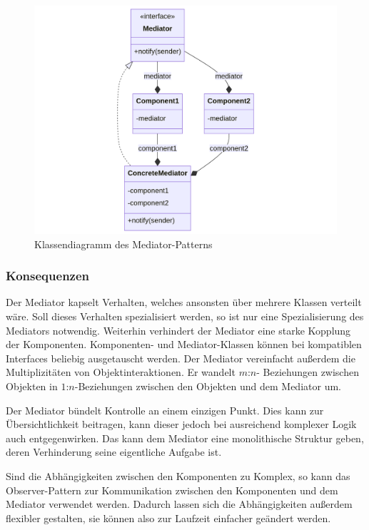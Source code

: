 \begin{figure}[H]
	\centering
	\includegraphics[width=0.75\linewidth]{images/patterns/mediator-class.png}
	\caption{Klassendiagramm des Mediator-Patterns \cite{skobeleva_mediator_2023}}
	\label{fig:mediator-class}
\end{figure}

\subsubsection*{Konsequenzen}

Der Mediator kapselt Verhalten, welches ansonsten über mehrere Klassen verteilt wäre. Soll dieses Verhalten spezialisiert werden, so ist nur eine Spezialisierung des Mediators notwendig. Weiterhin verhindert der Mediator eine starke Kopplung der Komponenten. Komponenten- und Mediator-Klassen können bei kompatiblen Interfaces beliebig ausgetauscht werden. Der Mediator vereinfacht außerdem die Multiplizitäten von Objektinteraktionen. Er wandelt $m$:$n$- Beziehungen zwischen Objekten in $1$:$n$-Beziehungen zwischen den Objekten und dem Mediator um.

Der Mediator bündelt Kontrolle an einem einzigen Punkt. Dies kann zur Übersichtlichkeit beitragen, kann dieser jedoch bei ausreichend komplexer Logik auch entgegenwirken. Das kann dem Mediator eine monolithische Struktur geben, deren Verhinderung seine eigentliche Aufgabe ist.

Sind die Abhängigkeiten zwischen den Komponenten zu Komplex, so kann das Observer-Pattern zur Kommunikation zwischen den Komponenten und dem Mediator verwendet werden. Dadurch lassen sich die Abhängigkeiten außerdem flexibler gestalten, sie können also zur Laufzeit einfacher geändert werden. \cite{gamma_design_1995}